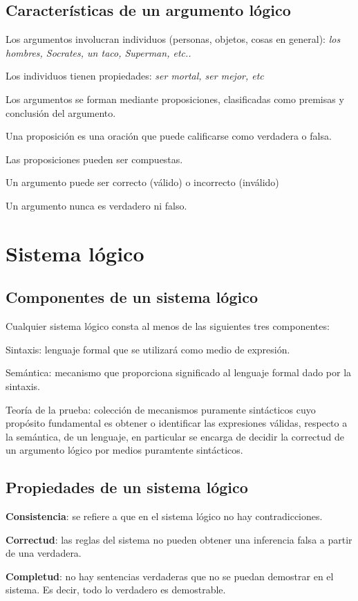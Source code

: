 \documentclass[11pt,letterpaper]{article}
\begin{document}
\subsection{Características de un argumento lógico}

\bi
 \item Los argumentos involucran individuos (personas, objetos, cosas en
  general): \emph{los hombres, Socrates, un taco, Superman, etc..}
 \item Los individuos tienen propiedades: \emph{ser mortal, ser mejor, etc}
 \item Los argumentos se forman mediante proposiciones, clasificadas como
  premisas y conclusión del argumento. 
 \item Una proposición es una oración que puede calificarse como verdadera o 
  falsa.
 \item Las proposiciones pueden ser compuestas.
 \item Un argumento puede ser correcto (válido) o incorrecto (inválido)
 \item Un argumento nunca es verdadero ni falso.
\ei



\section{Sistema l\'ogico}

\subsection{Componentes de un sistema lógico}

Cualquier sistema lógico consta al menos de las siguientes tres componentes:
\bi
 \item Sintaxis: lenguaje formal que se utilizará como medio de expresión.
 \item Semántica: mecanismo que proporciona significado al lenguaje formal dado 
  por la sintaxis.
 \item Teoría de la prueba: colección de mecanismos puramente sintácticos cuyo 
  propósito fundamental es obtener o identificar las expresiones válidas, 
  respecto a la semántica, de un lenguaje, en particular se encarga de decidir 
  la correctud de un argumento lógico por medios puramtente sintácticos.
\ei

\subsection{Propiedades de un sistema l\'ogico}
\bi
\item \textbf{Consistencia}: se refiere a que en el sistema l\'ogico no hay
contradicciones.
\item \textbf{Correctud}: las reglas del sistema no pueden obtener una 
inferencia falsa a partir de una verdadera.
\item \textbf{Completud}: no hay sentencias verdaderas que no se puedan 
demostrar en el sistema. Es decir, todo lo verdadero es demostrable.
\ei
\end{document}
